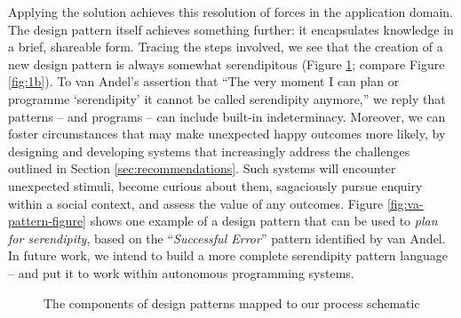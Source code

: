 %
%
Applying the solution achieves this resolution of forces in the
application domain.
The design pattern itself achieves something further: it encapsulates
knowledge in a brief, shareable form.  Tracing the steps involved, we
see that the creation of a new design pattern is always somewhat
serendipitous (Figure \ref{fig:pattern-schematic}; compare Figure
\ref{fig:1b}).
To van Andel's assertion that ``The very moment I can plan or
programme `serendipity' it cannot be called serendipity anymore,'' we
reply that patterns -- and programs -- can include built-in
indeterminacy.  Moreover, we can foster circumstances that may make
unexpected happy outcomes more likely, by designing and developing
systems that increasingly address the challenges outlined in Section
\ref{sec:recommendations}.  Such systems will encounter unexpected
stimuli, become curious about them, sagaciously pursue enquiry
within a social context, and assess the value of any outcomes.
%
Figure \ref{fig:va-pattern-figure} shows one example of a design
pattern that can be used to \emph{plan for serendipity}, based on the
``\emph{Successful Error}'' pattern identified by van Andel.  In
future work, we intend to build a more complete serendipity pattern
language -- and put it to work within autonomous programming systems.


\begin{figure}[!h]
\vspace{.3cm}

\vspace{-.3cm}
\caption{The components of design patterns mapped to our process schematic\label{fig:pattern-schematic}}
\end{figure}

